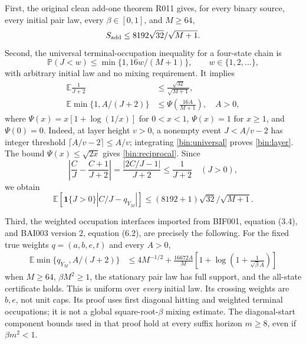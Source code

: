 First, the original clean add-one theorem R011 gives, for every binary source, every initial pair law, every $\beta\in[0,1]$, and $M\ge64$,
\begin{equation}
 S_{\rm add}\le8192\sqrt{32}/\sqrt{M+1}.
 \label{bin:cleanimport}
\end{equation}
Second, the universal terminal-occupation inequality for a four-state chain is
\begin{equation}
 \mathbb P(J<w)\le\min\{1,16w/(M+1)\},
 \qquad w\in\{1,2,\ldots\},
 \label{bin:universal}
\end{equation}
with arbitrary initial law and no mixing requirement. It implies
\begin{align}
 \mathbb E\frac1{J+2}&\le\frac{\sqrt{32}}{\sqrt{M+1}},\label{bin:reciprocal}\\
 \mathbb E\min\{1,A/(J+2)\}&\le\Psi\left(\frac{16A}{M+1}\right),
 \quad A>0,\label{bin:layer}
\end{align}
where $\Psi(x)=x[1+\log(1/x)]$ for $0<x<1$, $\Psi(x)=1$ for $x\ge1$, and $\Psi(0)=0$. Indeed, at layer height $v>0$, a nonempty event $J<A/v-2$ has integer threshold $\lceil A/v-2\rceil\le A/v$; integrating \eqref{bin:universal} proves \eqref{bin:layer}. The bound $\Psi(x)\le\sqrt{2x}$ gives \eqref{bin:reciprocal}. Since
\[
 \left|\frac CJ-\frac{C+1}{J+2}\right|
 =\frac{|2C/J-1|}{J+2}\le\frac1{J+2}\quad(J>0),
\]
we obtain
\begin{equation}
 \mathbb E\left[\mathbf 1\{J>0\}|C/J-q_{Y_M}|\right]
 \le(8192+1)\sqrt{32}/\sqrt{M+1}.
 \label{bin:comparator}
\end{equation}

Third, the weighted occupation interfaces imported from BIF001, equation (3.4), and BAI003 version 2, equation (6.2), are precisely the following. For the fixed true weights $q=(a,b,e,t)$ and every $A>0$,
\begin{align}
 \mathbb E\min\{q_{Y_M},A/(J+2)\}
 &\le4M^{-1/2}+\frac{16672A}{M}
       \left[1+\log\left(1+\frac1{\sqrt\beta A}\right)\right]
 \label{bin:fullsupport}
\end{align}
when $M\ge64$, $\beta M^2\ge1$, the stationary pair law has full support, and the all-state certificate holds. This is uniform over \emph{every} initial law. Its crossing weights are $b,e$, not unit caps. Its proof uses first diagonal hitting and weighted terminal occupations; it is not a global square-root-$\beta$ mixing estimate. The diagonal-start component bounds used in that proof hold at every suffix horizon $m\ge8$, even if $\beta m^2<1$.

